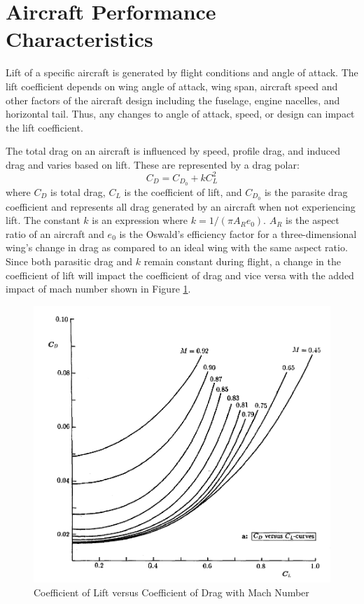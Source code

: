 \section{Aircraft Performance Characteristics}
Lift of a specific aircraft is generated by flight conditions and angle of attack. The lift coefficient depends on wing angle of attack, wing span, aircraft speed and other factors of the aircraft design including the fuselage, engine nacelles, and horizontal tail. Thus, any changes to angle of attack, speed, or design can impact the lift coefficient. \par
The total drag on an aircraft is influenced by speed, profile drag, and induced drag and varies based on lift. These are represented by a drag polar:
\begin{equation*}
    C_D = C_{D_0} + kC_L^2
\end{equation*}
where $C_D$ is total drag, $C_L$ is the coefficient of lift, and $C_{D_0}$ is the parasite drag coefficient and represents all drag generated by an aircraft when not experiencing lift. The constant $k$ is an expression where $k = 1/(\pi A_R e_0)$. $A_R$ is the aspect ratio of an aircraft and $e_0$ is the Oswald's efficiency factor for a three-dimensional wing's change in drag as compared to an ideal wing with the same aspect ratio. Since both parasitic drag and $k$ remain constant during flight, a change in the coefficient of lift will impact the coefficient of drag and vice versa with the added impact of mach number shown in Figure \ref{fig:clvscd}.
\begin{figure}[h] 
    \centering
    \includegraphics[width = 12cm]{Thesis/LiteratureReview/clvscd.PNG}
    \caption{Coefficient of Lift versus Coefficient of Drag with Mach Number \cite{torenbeek}}
    \label{fig:clvscd}
\end{figure}
